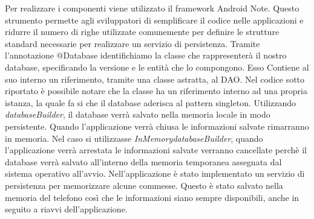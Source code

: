 \documentclass[12pt]{report}
\begin{document}
\newpage
Per realizzare i componenti viene utilizzato il framework Android Note. %
Questo strumento permette agli sviluppatori di semplificare il codice nelle applicazioni e ridurre il numero di righe utilizzate comunemente per definire le strutture standard necessarie per realizzare un servizio di persistenza. Tramite l'annotazione @Database identifichiamo la classe che rappresenterà il nostro database, specificando la versione e le entità che lo compongono. Esso Contiene al suo interno un riferimento, tramite una classe astratta, al DAO.  Nel codice sotto riportato è possibile notare che la classe ha un riferimento interno ad una propria istanza, la quale fa si che il database aderisca al pattern singleton. Utilizzando \textit{databaseBuilder}, il database verrà salvato nella memoria locale in modo persistente. Quando l'applicazione verrà chiusa le informazioni salvate rimarranno in memoria. Nel caso si utilizzasse \textit{InMemorydatabaseBuilder}, quando l'applicazione verrà arrestata le informazioni salvate verranno cancellate perchè il database verrà salvato all'interno della memoria temporanea assegnata dal sistema operativo all'avvio. Nell'applicazione è stato implementato un servizio di persistenza per memorizzare alcune commesse. Questo è stato salvato nella memoria del telefono così che le informazioni siano sempre disponibili, anche in seguito a riavvi dell'applicazione.


\end{document}
